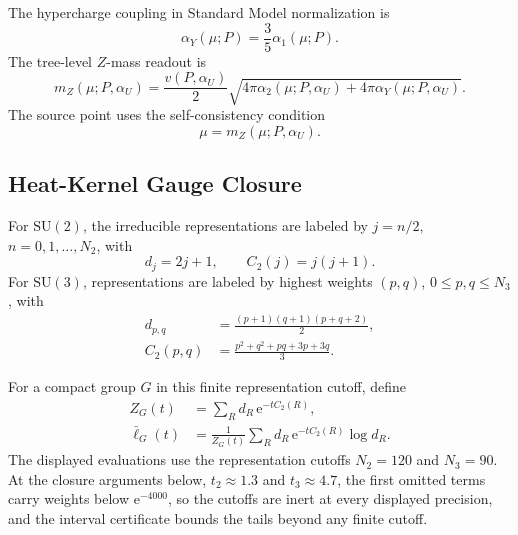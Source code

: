 \documentclass[11pt]{article}
\theoremstyle{remark}
\newcommand{\SU}{\mathrm{SU}}
\newcommand{\e}{\mathrm e}
\begin{document}
The hypercharge coupling in Standard Model normalization is
\begin{equation}
\alpha_Y(\mu;P)=\frac{3}{5}\alpha_1(\mu;P).
\label{eq:alphaY}
\end{equation}
The tree-level \(Z\)-mass readout is
\begin{equation}
m_Z(\mu;P,\alpha_U)
=
\frac{v(P,\alpha_U)}{2}
\sqrt{4\pi\alpha_2(\mu;P,\alpha_U)+4\pi\alpha_Y(\mu;P,\alpha_U)}.
\label{eq:mZtree}
\end{equation}
The source point uses the self-consistency condition
\begin{equation}
\mu=m_Z(\mu;P,\alpha_U).
\label{eq:mZfixed}
\end{equation}


\subsection{Heat-Kernel Gauge Closure}
\label{sec:alpha-step-11}

For \(\SU(2)\), the irreducible representations are labeled by \(j=n/2\), \(n=0,1,\ldots,N_2\), with
\begin{equation}
d_j=2j+1,
\qquad
C_2(j)=j(j+1).
\label{eq:su2rep}
\end{equation}
For \(\SU(3)\), representations are labeled by highest weights \((p,q)\), \(0\le p,q\le N_3\), with
\begin{align}
d_{p,q}&=\frac{(p+1)(q+1)(p+q+2)}{2},
\label{eq:su3dim}\\
C_2(p,q)&=\frac{p^2+q^2+pq+3p+3q}{3}.
\label{eq:su3casimir}
\end{align}

For a compact group \(G\) in this finite representation cutoff, define
\begin{align}
Z_G(t)&=\sum_R d_R\,\e^{-tC_2(R)},\\
\bar\ell_G(t)&=
\frac{1}{Z_G(t)}
\sum_R d_R\,\e^{-tC_2(R)}\log d_R.
\label{eq:ellbar}
\end{align}
The displayed evaluations use the representation cutoffs \(N_2=120\) and
\(N_3=90\). At the closure arguments below, \(t_2\approx1.3\) and
\(t_3\approx4.7\), the first omitted terms carry weights below
\(\e^{-4000}\), so the cutoffs are inert at every displayed precision, and
the interval certificate bounds the tails beyond any finite cutoff.
\end{document}
